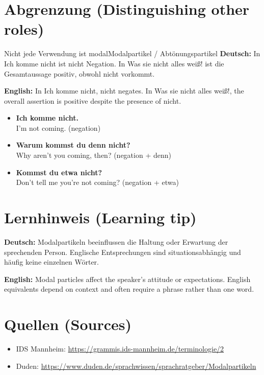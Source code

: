 \documentclass[a4paper,11pt]{article}
\newcommand{\GermanText}[1]{\textbf{Deutsch: }#1\par}
\newcommand{\EnglishText}[1]{{\small\color{SoftGray}\textbf{English: }#1\par}}
\newcommand{\ExampleItem}[2]{\item \textbf{#1}\\{\small\color{SoftGray}#2}}
\begin{document}
\section{Abgrenzung \textnormal{(Distinguishing other roles)}}
\begin{grammarentry}{Nicht jede Verwendung ist modal}{Modalpartikel / Abtönungspartikel}
\GermanText{In Ich komme nicht ist nicht Negation. In Was sie nicht alles weiß! ist die Gesamtaussage positiv, obwohl nicht vorkommt.}
\EnglishText{In Ich komme nicht, nicht negates. In Was sie nicht alles weiß!, the overall assertion is positive despite the presence of nicht.}
\end{grammarentry}
\begin{exbox}\begin{itemize}
\ExampleItem{Ich komme nicht.}{I'm not coming. (negation)}
\ExampleItem{Warum kommst du denn nicht?}{Why aren't you coming, then? (negation + denn)}
\ExampleItem{Kommst du etwa nicht?}{Don't tell me you're not coming? (negation + etwa)}
\end{itemize}\end{exbox}
\section{Lernhinweis \textnormal{(Learning tip)}}
\GermanText{Modalpartikeln beeinflussen die Haltung oder Erwartung der sprechenden Person. Englische Entsprechungen sind situationsabhängig und häufig keine einzelnen Wörter.}
\EnglishText{Modal particles affect the speaker's attitude or expectations. English equivalents depend on context and often require a phrase rather than one word.}
\section{Quellen \textnormal{(Sources)}}
\begin{itemize}
\item IDS Mannheim: \url{https://grammis.ids-mannheim.de/terminologie/2}
\item Duden: \url{https://www.duden.de/sprachwissen/sprachratgeber/Modalpartikeln}
\end{itemize}
\end{document}
